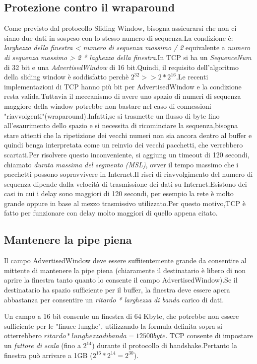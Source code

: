 \subsection{Protezione contro il wraparound}
Come previsto dal protocollo Sliding Window, bisogna assicurarsi che non ci siano due dati in sospeso con lo stesso numero di sequenza.La condizione è: \textit{larghezza della finestra < numero di sequenza massimo / 2} equivalente a \textit{numero di sequenza massimo > 2 * laghezza della finestra}.In TCP si ha un \textit{SequenceNum} di 32 bit e una \textit{AdvertisedWindow} di 16 bit.Quindi, il requisito dell'algoritmo della sliding window è soddisfatto perchè $2^{32} >> 2*2^{16}$.Le recenti implementazioni di TCP hanno più bit per AdvertisedWindow e la condizione resta valida.Tuttavia il meccanismo di avere uno spazio di numeri di sequenza maggiore della window potrebbe non bastare nel caso di connessioni "riavvolgenti"(wraparound).Infatti,se si trasmette un flusso di byte fino all'esaurimento dello spazio e  si necessita di ricominciare la sequenza,bisogna stare attenti che la ripetizione dei vecchi numeri non sia ancora dentro al buffer e quindi benga interpretata come un reinvio dei vecchi pacchetti, che verrebbero scartati.Per risolvere questo inconveniente, si aggiung un timeout di 120 secondi, chiamato \textit{durata massima del segmento (MSL)}, ovver il tempo massimo che i pacchetti possono sopravvivere in Internet.Il risci di riavvolgimento del numero di sequenza dipende dalla velocità di trasmissione dei dati su Internet.Esistono dei casi in cui i delay sono maggiori di 120 secondi, per esempio la rete è molto grande oppure in base al mezzo trasmissivo utilizzato.Per questo motivo,TCP è fatto per funzionare con delay molto maggiori di quello appena citato.
\subsection{Mantenere la pipe piena}
Il campo AdvertisedWindow deve essere suffiientemente grande da consentire al mittente di mantenere la pipe piena (chiaramente il destinatario è libero di non aprire la finestra tanto quanto lo consente il campo AdvertisedWindow).Se il destinatario ha spazio sufficiente per il buffer, la finestra deve essere apera abbastanza per consentire un \textit{ritardo * larghezza di banda} carico di dati.
\begin{example}
  Un campo a 16 bit consente un finestra di 64 Kbyte, che potrebbe non essere sufficiente per le "linuee lunghe", utilizzando la formula definita sopra si otterrebbero $ritardo * lunghezza di banda = 12500 byte$. TCP consente di impostare un \textit{fattore di scala} (fino a $2^{14}$) durante il protocollo di handshake.Pertanto la finestra può arrivare a 1GB ($2^{16} * 2^{14} = 2^{30}$).
\end{example}
